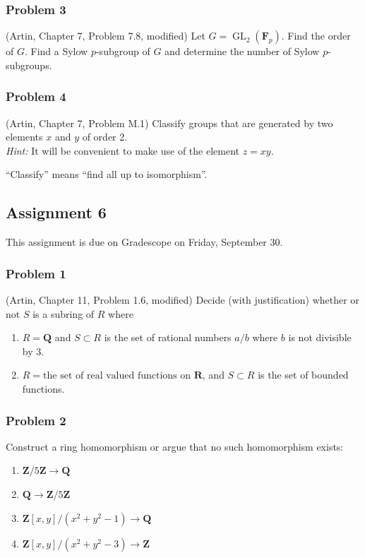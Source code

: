 \documentclass[11pt]{article}
\begin{document}
\subsubsection*{Problem 3}
\label{sec:orgf8b9be4}
(Artin, Chapter 7, Problem 7.8, modified)
Let \(G = \operatorname{GL}_2(\mathbf{F}_p)\).
Find the order of \(G\).
Find a Sylow \(p\)-subgroup of \(G\) and determine the number of Sylow \(p\)-subgroups.

\subsubsection*{Problem 4}
\label{sec:orge558282}
(Artin, Chapter 7, Problem M.1)
Classify groups that are generated by two elements \(x\) and \(y\) of order 2.\\
\emph{Hint:} It will be convenient to make use of the element \(z = xy\).

``Classify'' means ``find all up to isomorphism''.


\subsection*{Assignment 6}
\label{sec:org169ed8b}
This assignment is due on Gradescope on Friday, September 30.
\subsubsection*{Problem 1}
\label{sec:orgb5e53b1}
(Artin, Chapter 11, Problem 1.6, modified)
Decide (with justification) whether or not \(S\) is a subring of \(R\) where
\begin{enumerate}
\item \(R = \mathbf{Q}\) and \(S \subset R\) is the set of rational numbers \(a/b\) where \(b\) is not divisible by 3.
\item \(R = \text{the set of real valued functions on $\mathbf{R}$}\), and \(S \subset R\) is the set of bounded functions.
\end{enumerate}
\subsubsection*{Problem 2}
\label{sec:org61581dd}
Construct a ring homomorphism or argue that no such homomorphism exists:
\begin{enumerate}
\item \(\mathbf{Z}/5 \mathbf{Z} \to \mathbf{Q}\)
\item \(\mathbf{Q} \to \mathbf{Z}/ 5 \mathbf{Z}\)
\item \(\mathbf{Z}[x,y]/(x^2+y^2-1) \to \mathbf{Q}\)
\item \(\mathbf{Z}[x,y]/(x^2+y^2-3) \to \mathbf{Z}\)
\end{enumerate}
\end{document}
